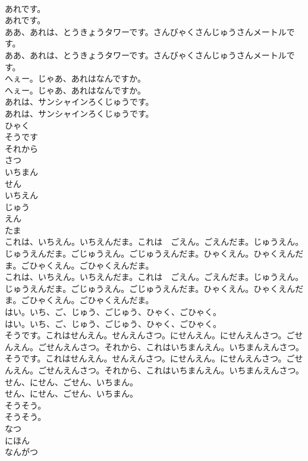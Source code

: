 \documentclass[8pt]{extreport}
\begin{document}
\begin{CJK}{UTF8}{min}
\\	あれです。	
\\	あれです。 
\\	ああ、あれは、とうきょうタワーです。さんびゃくさんじゅうさんメートルです。	
\\	ああ、あれは、とうきょうタワーです。さんびゃくさんじゅうさんメートルです。 
\\	へぇー。じゃあ、あれはなんですか。	
\\	へぇー。じゃあ、あれはなんですか。 
\\	あれは、サンシャインろくじゅうです。	
\\	あれは、サンシャインろくじゅうです。 
\\	ひゃく
\\	そうです
\\	それから
\\	さつ
\\	いちまん
\\	せん
\\	いちえん
\\	じゅう
\\	えん
\\	たま
\\	これは、いちえん。いちえんだま。これは　ごえん。ごえんだま。じゅうえん。じゅうえんだま。ごじゅうえん。ごじゅうえんだま。ひゃくえん。ひゃくえんだま。ごひゃくえん。ごひゃくえんだま。	
\\	これは、いちえん。いちえんだま。これは　ごえん。ごえんだま。じゅうえん。じゅうえんだま。ごじゅうえん。ごじゅうえんだま。ひゃくえん。ひゃくえんだま。ごひゃくえん。ごひゃくえんだま。 
\\	はい。いち、ご、じゅう、ごじゅう、ひゃく、ごひゃく。	
\\	はい。いち、ご、じゅう、ごじゅう、ひゃく、ごひゃく。 
\\	そうです。これはせんえん。せんえんさつ。にせんえん。にせんえんさつ。ごせんえん。ごせんえんさつ。それから、これはいちまんえん。いちまんえんさつ。	
\\	そうです。これはせんえん。せんえんさつ。にせんえん。にせんえんさつ。ごせんえん。ごせんえんさつ。それから、これはいちまんえん。いちまんえんさつ。 
\\	せん、にせん、ごせん、いちまん。	
\\	せん、にせん、ごせん、いちまん。 
\\	そうそう。	
\\	そうそう。 
\\	なつ
\\	にほん
\\	なんがつ

\end{CJK}
\end{document}
